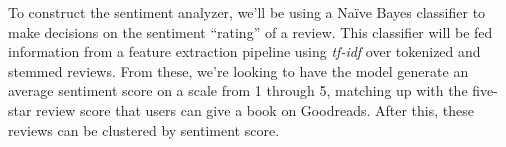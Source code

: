 To construct the sentiment analyzer, we'll be using a Na\"ive Bayes classifier to make decisions on
the sentiment ``rating'' of a review. This classifier will be fed information
from a feature extraction pipeline using \textit{tf-idf} over tokenized and stemmed
reviews. From these, we're looking to have the model generate an average sentiment
score on a scale from 1 through 5, matching up with the five-star review score that
users can give a book on Goodreads. After this, these reviews can be clustered by
sentiment score.